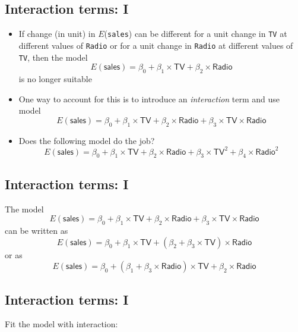\documentclass[]{article}
\providecommand{\tightlist}{%
  \setlength{\itemsep}{0pt}\setlength{\parskip}{0pt}}
\begin{document}
\subsection{Interaction terms: I}\label{interaction-terms-i-1}

\begin{itemize}
\tightlist
\item
  If change (in unit) in \(E\)(\texttt{sales}) can be different for a
  unit change in \texttt{TV} at different values of \texttt{Radio} or
  for a unit change in \texttt{Radio} at different values of
  \texttt{TV}, then the model \[
  E(\textsf{sales}) = \beta_0 + \beta_1 \times\textsf{TV} + \beta_2 \times\textsf{Radio}
  \] is no longer suitable\\
\item
  One way to account for this is to introduce an \emph{interaction} term
  and use model \[
  E(\textsf{sales}) = \beta_0 + \beta_1 \times \textsf{TV} + \beta_2 \times\textsf{Radio} + \beta_3 \times\textsf{TV} \times\textsf{Radio}
  \]
\item
  Does the following model do the job? \[
  E(\textsf{sales}) = \beta_0 + \beta_1 \times \textsf{TV} + \beta_2 \times \textsf{Radio} + \beta_3 \times \textsf{TV}^2+ \beta_4 \times \textsf{Radio}^2
  \]
\end{itemize}

\subsection{Interaction terms: I}\label{interaction-terms-i-2}

The model \[
E(\textsf{sales}) = \beta_0 + \beta_1 \times \textsf{TV} + \beta_2 \times\textsf{Radio} + \beta_3 \times\textsf{TV} \times\textsf{Radio}
\] can be written as \[
E(\textsf{sales}) = \beta_0 + \beta_1 \times \textsf{TV} + (\beta_2+  \beta_3 \times\textsf{TV})\times\textsf{Radio}
\] or as \[
E(\textsf{sales}) = \beta_0 + (\beta_1 +\beta_3 \times\textsf{Radio})\times \textsf{TV} + \beta_2 \times\textsf{Radio}
\]

\subsection{Interaction terms: I}\label{interaction-terms-i-3}

Fit the model with interaction:
\end{document}
